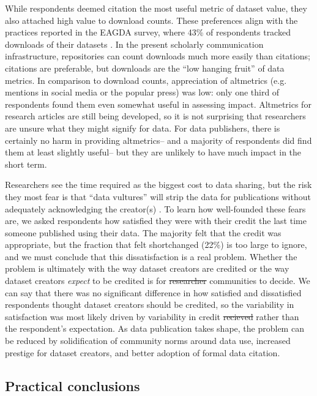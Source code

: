 \documentclass[10pt]{article}
\providecommand{\DIFaddtex}[1]{{\protect\color{blue}\uwave{#1}}} %
\providecommand{\DIFdeltex}[1]{{\protect\color{red}\sout{#1}}}                      %
\providecommand{\DIFaddbegin}{} %
\providecommand{\DIFaddend}{} %
\providecommand{\DIFdelbegin}{} %
\providecommand{\DIFdelend}{} %
\providecommand{\DIFadd}[1]{\texorpdfstring{\DIFaddtex{#1}}{#1}} %
\providecommand{\DIFdel}[1]{\texorpdfstring{\DIFdeltex{#1}}{}} %
\begin{document}
While respondents deemed citation the most useful metric of dataset value, they also attached high value to download counts.
These preferences align with the practices reported in the EAGDA survey, where 43\% of respondents tracked downloads of their datasets \cite{bobrow_establishing_2014}.
In the present scholarly communication infrastructure, repositories can count downloads much more easily than citations; citations are preferable, but downloads are the ``low hanging fruit'' of data metrics.
In comparison to download counts, appreciation of altmetrics (e.g. mentions in social media or the popular press) was low: only one third of respondents found them even somewhat useful in assessing impact.
Altmetrics for research articles are still being developed, so it is not surprising that researchers are unsure what they might signify for data.
For data publishers, there is certainly no harm in providing altmetrics-- and a majority of respondents did find them at least slightly useful-- but they are unlikely to have much impact in the short term.

Researchers see the time required as the biggest cost to data sharing, but the risk they most fear is that ``data vultures'' will strip the data for publications without adequately acknowledging the creator(s) \cite{kim_institutional_2012}.
To learn how well-founded these fears are, we asked respondents how satisfied they were with their credit the last time someone published using their data.
The majority felt that the credit was appropriate, but the fraction that felt shortchanged (22\%) is too large to ignore, and we must conclude that this dissatisfaction is a real problem.
Whether the problem is ultimately with the way dataset creators are credited or the way dataset creators \textit{expect} to be credited is for \DIFdelbegin \DIFdel{researcher }\DIFdelend \DIFaddbegin \DIFadd{research }\DIFaddend communities to decide.
We can say that there was no significant difference in how satisfied and dissatisfied respondents thought dataset creators should be credited, so the variability in satisfaction was most likely driven by variability in credit \DIFdelbegin \DIFdel{recieved }\DIFdelend \DIFaddbegin \DIFadd{received }\DIFaddend rather than the respondent's expectation.
As data publication takes shape, the problem can be reduced by solidification of community norms around data use, increased prestige for dataset creators, and better adoption of formal data citation.

\subsection*{Practical conclusions}
\end{document}
